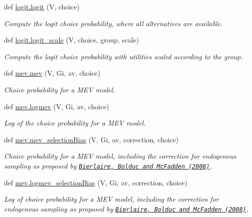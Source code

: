 \begin{DoxyCompactItemize}
def \hyperlink{group__models_ga3917c75704c624eac9d67a7b9edb651d}{logit.\+logit} (V, choice)
\begin{DoxyCompactList}\small\item\em Compute the logit choice probability, where all alternatives are available. \end{DoxyCompactList}\item 
def \hyperlink{group__models_ga46e956b929c828c47c60e4ce414d570e}{logit.\+logit\+\_\+scale} (V, choice, group, scale)
\begin{DoxyCompactList}\small\item\em Compute the logit choice probability with utilities scaled according to the group. \end{DoxyCompactList}\item 
def \hyperlink{group__models_ga73dedfec95ea7f0a438607d0b150ea1c}{mev.\+mev} (V, Gi, av, choice)
\begin{DoxyCompactList}\small\item\em Choice probability for a M\+EV model. \end{DoxyCompactList}\item 
def \hyperlink{group__models_ga7efc936612380b8713ba501c3134255a}{mev.\+logmev} (V, Gi, av, choice)
\begin{DoxyCompactList}\small\item\em Log of the choice probability for a M\+EV model. \end{DoxyCompactList}\item 
def \hyperlink{group__models_ga35783e69358bb7c705d8594438f16307}{mev.\+mev\+\_\+selection\+Bias} (V, Gi, av, correction, choice)
\begin{DoxyCompactList}\small\item\em Choice probability for a M\+EV model, including the correction for endogenous sampling as proposed by \href{http://dx.doi.org/10.1016/j.trb.2007.09.003}{\tt Bierlaire, Bolduc and Mc\+Fadden (2008)}. \end{DoxyCompactList}\item 
def \hyperlink{group__models_ga943e542b2505591e45672d27a8ab4e69}{mev.\+logmev\+\_\+selection\+Bias} (V, Gi, av, correction, choice)
\begin{DoxyCompactList}\small\item\em Log of choice probability for a M\+EV model, including the correction for endogenous sampling as proposed by \href{http://dx.doi.org/10.1016/j.trb.2007.09.003}{\tt Bierlaire, Bolduc and Mc\+Fadden (2008)}. \end{DoxyCompactList}\item 

\end{DoxyCompactItemize}
